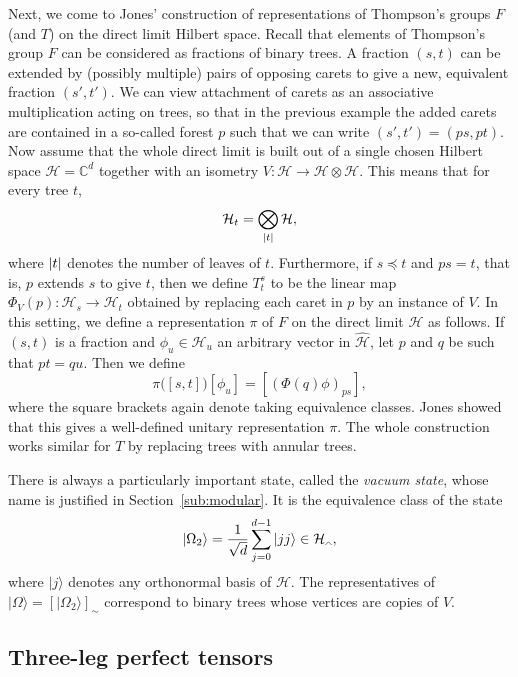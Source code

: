 \documentclass[11pt,oneside]{amsart}
\theoremstyle{plain}%
\theoremstyle{definition}
\theoremstyle{remark}
\DeclarePairedDelimiter\abs{\lvert}{\rvert}
\begin{document}
Next, we come to Jones' construction of representations of Thompson's groups $F$ (and $T$) on the direct limit Hilbert space. Recall that elements of Thompson's group $F$ can be considered as fractions of binary trees. A fraction $(s, t)$ can be extended by (possibly multiple) pairs of opposing carets to give a new, equivalent fraction $(s', t')$. We can view attachment of carets as an associative multiplication acting on trees, so that in the previous example the added carets are contained in a so-called forest $p$ such that we can write $(s', t')=(ps,pt)$. Now assume that the whole direct limit is built out of a single chosen Hilbert space $\mathcal{H}=\mathbb{C}^d$ together with an isometry $V\colon\mathcal{H}\to\mathcal{H}\otimes\mathcal{H}$. This means that for every tree $t$,
\begin{equation}
	\mathcal{H}_t=\bigotimes_{\abs{t}} \mathcal{H},
\end{equation}
where $\abs{t}$ denotes the number of leaves of $t$. Furthermore, if $s\preceq t$ and $ps=t$, that is, $p$ extends $s$ to give $t$, then we define $T^s_t$ to be the linear map $\Phi_V(p)\colon\mathcal{H}_s\to\mathcal{H}_t$ obtained by replacing each caret in $p$ by an instance of $V$. In this setting, we define a representation $\pi$ of $F$ on the direct limit $\mathcal{H}$ as follows. If $(s, t)$ is a fraction and $\phi_u\in\mathcal{H}_u$ an arbitrary vector in $\hat{\mathcal{H}}$, let $p$ and $q$ be such that $pt=qu$. Then we define
\begin{equation}
	\pi\bigl( [s, t] \bigr) [\phi_u] = [(\Phi(q)\phi)_{ps}],
\end{equation}
where the square brackets again denote taking equivalence classes. Jones showed that this gives a well-defined unitary representation $\pi$. The whole construction works similar for $T$ by replacing trees with annular trees.

There is always a particularly important state, called the \emph{vacuum state}, whose name is justified in Section~\ref{sub:modular}. It is the equivalence class of the state
\begin{equation}
	|\Omega_2\rangle =\frac{1}{\sqrt d} \sum_{j=0}^{d-1} |jj\rangle\in\mathcal{H}_{\tikz[scale=0.08]{\draw (0, 0) -- (1, 1) -- (2, 0);}},
\end{equation}
where $|j\rangle$ denotes any orthonormal basis of $\mathcal{H}$. The representatives of $|\Omega\rangle=[|\Omega_2\rangle]_{\sim}$ correspond to binary trees whose vertices are copies of $V$.

\subsection{Three-leg perfect tensors}
\end{document}
